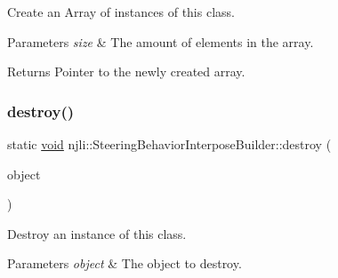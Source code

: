 Create an Array of instances of this class.


\begin{DoxyParams}{Parameters}
{\em size} & The amount of elements in the array.\\
\hline
\end{DoxyParams}
\begin{DoxyReturn}{Returns}
Pointer to the newly created array. 
\end{DoxyReturn}
\mbox{\label{classnjli_1_1_steering_behavior_interpose_builder_a5ef4cd3991f5e1dc151aa7f48c05e64e}} 
\subsubsection{\texorpdfstring{destroy()}{destroy()}}
{\footnotesize\ttfamily static \mbox{\hyperlink{_thread_8h_af1e856da2e658414cb2456cb6f7ebc66}{void}} njli\+::\+Steering\+Behavior\+Interpose\+Builder\+::destroy (\begin{DoxyParamCaption}\item[{\mbox{\hyperlink{classnjli_1_1_steering_behavior_interpose_builder}{Steering\+Behavior\+Interpose\+Builder}} $\ast$}]{object }\end{DoxyParamCaption})\hspace{0.3cm}{\ttfamily [static]}}

Destroy an instance of this class.


\begin{DoxyParams}{Parameters}
{\em object} & The object to destroy. \\
\hline
\end{DoxyParams}
\mbox{\label{classnjli_1_1_steering_behavior_interpose_builder_aab0057888dbb1106bddda16f4a8ac1f9}} 
